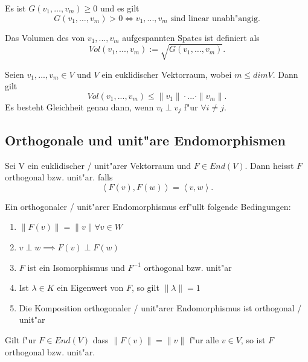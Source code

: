 \documentclass[11pt, a4paper]{article}
\begin{document}
\begin{remark}
Es ist $G\left(v_{1}, \ldots, v_{m}\right) \geq 0$ und es gilt
$$
G\left(v_{1}, \ldots, v_{m}\right) > 0 \Leftrightarrow v_1, ..., v_m \text{ sind linear unabh"angig.}
$$
\end{remark}

\begin{definition}
Das Volumen des von  $v_1, ..., v_m$ aufgespannten Spates ist definiert als 
$$
Vol(v_1, ..., v_m) := \sqrt{G\left(v_{1}, \ldots, v_{m}\right)}.
$$
\end{definition}

\begin{theorem}
Seien $v_1, ..., v_m \in V$ und $V$ ein euklidischer Vektorraum, wobei $m \leq dim V$. Dann gilt
$$
Vol(v_1, ..., v_m) \leq \|v_1\| \cdot ... \cdot \|v_m\|.
$$
Es besteht Gleichheit genau dann, wenn $v_i \perp v_j$ f"ur $\forall i \neq j$.


\end{theorem}

\subsection{Orthogonale und unit"are Endomorphismen}
\begin{definition}
Sei V ein euklidischer / unit"arer Vektorraum und $F \in End(V)$. Dann heisst $F$ orthogonal bzw. unit"ar. falls
$$
\left\langle F(v), F(w) \right\rangle = \left\langle v, w \right\rangle.
$$
\end{definition}

\begin{remark}
Ein orthogonaler / unit"arer Endomorphismus erf"ullt folgende Bedingungen:
\begin{enumerate}
\item $\| F(v) \| = \|v\| \forall v \in W$
\item $ v \perp w \implies F(v) \perp F(w)$
\item $F$ ist ein Isomorphismus und $F^{-1}$ orthogonal bzw. unit"ar
\item Ist $\lambda \in K$ ein Eigenwert von $F$, so gilt $\|\lambda \| = 1$\
\item Die Komposition orthogonaler / unit"arer Endomorphismus ist orthogonal / unit"ar
\end{enumerate}
\end{remark}

\begin{lemma}
Gilt f"ur $F \in End(V)$ dass $\|F(v)\| = \|v\|$ f"ur alle $v \in V$, so ist $F$ orthogonal bzw. unit"ar.
\end{lemma}
\end{document}
